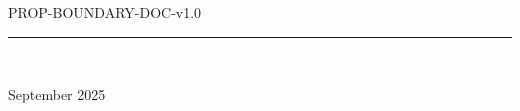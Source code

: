 %
%
%
%
%
%
%
%

\begin{titlepage}

\thispagestyle{empty}

\begin{flushleft}
PROP-BOUNDARY-DOC-v1.0
\end{flushleft}

\vspace{1cm}

\begin{flushleft}
\Huge{\textbf{\thetitle}}
\rule[0pt]{\textwidth}{5pt}
\end{flushleft}

\vspace{0.2cm}

\begin{flushleft}
\textit{\thetitle} \\
\end{flushleft}

\vfill
\vfill

\begin{flushright}
September 2025
\end{flushright}

\end{titlepage}
